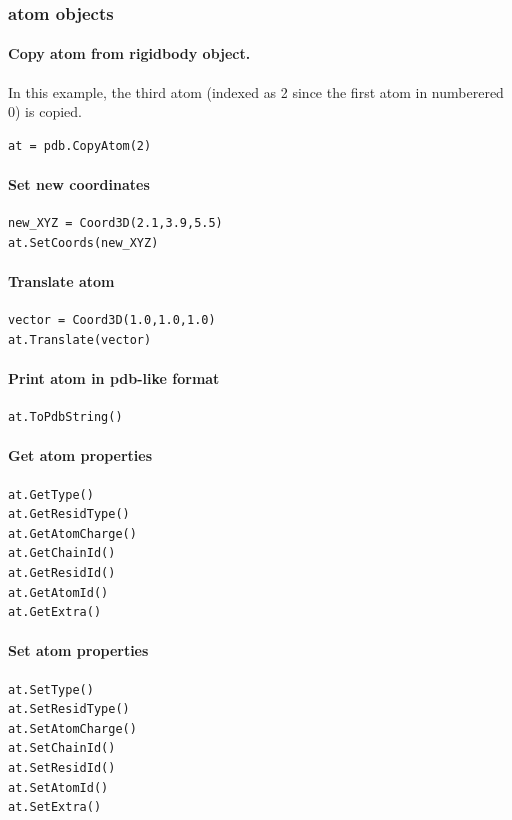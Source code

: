 \documentclass[12pt,a4paper]{article}
\begin{document}
\subsubsection{atom objects}

\paragraph{Copy atom from rigidbody object.} In this example, the third atom (indexed as 2 since the first atom in numberered 0) is copied.
\begin{verbatim}
at = pdb.CopyAtom(2)
\end{verbatim}

\paragraph{Set new coordinates}
\begin{verbatim}
new_XYZ = Coord3D(2.1,3.9,5.5)
at.SetCoords(new_XYZ)
\end{verbatim}

\paragraph{Translate atom}
\begin{verbatim}
vector = Coord3D(1.0,1.0,1.0)
at.Translate(vector)
\end{verbatim}


\paragraph{Print atom in pdb-like format}
\begin{verbatim}
at.ToPdbString()
\end{verbatim}

\paragraph{Get atom properties}
\begin{verbatim}
at.GetType()
at.GetResidType()
at.GetAtomCharge()
at.GetChainId()
at.GetResidId()
at.GetAtomId()
at.GetExtra()
\end{verbatim}

\paragraph{Set atom properties}
\begin{verbatim}
at.SetType()
at.SetResidType()
at.SetAtomCharge()
at.SetChainId()
at.SetResidId()
at.SetAtomId()
at.SetExtra()
\end{verbatim}
\end{document}
